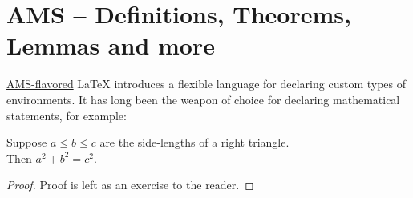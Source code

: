     \section{AMS -- Definitions, Theorems, Lemmas and more}
\href{https://en.wikipedia.org/wiki/AMS-LaTeX}{AMS-flavored} {\LaTeX} introduces a flexible language for declaring custom types of environments. It has long been the weapon of choice for declaring mathematical statements, for example:

  \begin{theorem}[Pythagoras] 
    Suppose $a\leq b\leq c$ are the side-lengths of a right triangle.\\  
    Then $a^2+b^2=c^2$.
  \end{theorem}
  \begin{proof}
    Proof is left as an exercise to the reader.
  \end{proof}
  
  